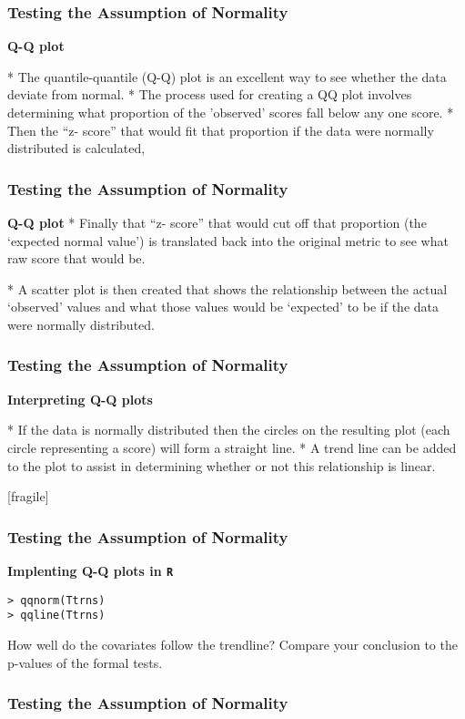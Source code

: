 
\frametitle{Testing the Assumption of Normality}

\textbf{Q-Q plot}

* The quantile-quantile (Q-Q) plot is an excellent way to see whether the data deviate from normal.
* The process used for creating a QQ plot involves determining what proportion of the 'observed' scores fall below any one score. 
* Then the “z- score” that would fit that proportion if the data were normally distributed is calculated,



\frametitle{Testing the Assumption of Normality}

\textbf{Q-Q plot}
* Finally that “z- score” that would cut off that proportion (the `expected normal value') is translated back into the original metric to see what raw score that would be. 

* A scatter plot is then created that shows the relationship between the actual `observed' values and what those values would be `expected' to be if the data were normally distributed. 



\frametitle{Testing the Assumption of Normality}

\textbf{Interpreting Q-Q plots}

* If the data is normally distributed then the circles on the resulting plot (each circle representing a score) will form a straight line. 
* A trend line can be added to the plot to assist in determining whether or not this relationship is linear.


[fragile]
\frametitle{Testing the Assumption of Normality}

\textbf{Implenting Q-Q plots in \texttt{R}}

\begin{framed}
\begin{verbatim}
> qqnorm(Ttrns) 
> qqline(Ttrns)
\end{verbatim}
\end{framed}
How well do the covariates follow the trendline? Compare your conclusion to the  p-values of the formal tests.


\frametitle{Testing the Assumption of Normality}


